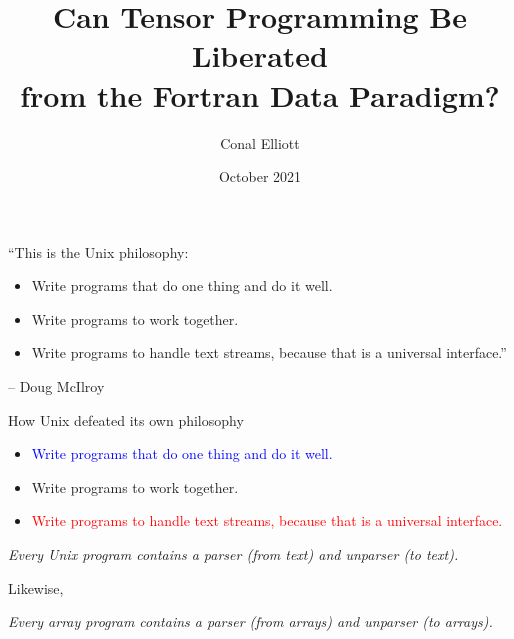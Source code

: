 \documentclass[aspectratio=169]{beamer}
\title[Can Tensor Programming Be Liberated ...?]{Can Tensor Programming Be Liberated\\ from the Fortran Data Paradigm?}
\author{Conal Elliott}
\date{October 2021}
\begin{document}
\maketitle

\begin{frame}{``This is the Unix philosophy:}
\begin{itemize}\itemsep4ex
\item Write programs that do one thing and do it well.
\item Write programs to work together.
\item Write programs to handle text streams, because that is a universal interface.''
\end{itemize}
\vspace{2ex}
\begin{flushright}
-- Doug McIlroy \hspace{0.5in}{\ }
\end{flushright}
\end{frame}

\begin{frame}{How Unix defeated its own philosophy}
\begin{itemize}\itemsep4ex
\item \textcolor{blue}{Write programs that do one thing and do it well.}
\item Write programs to work together.
\item \textcolor{red}{Write programs to handle text streams, because that is a universal interface.}
\end{itemize}

\pause
\vspace{5.5ex}
\emph{Every Unix program contains a parser (from text) and unparser (to text).}
\end{frame}

\begin{frame}{Likewise,}
\begin{center}
\emph{Every array program contains a parser (from arrays) and unparser (to arrays).}
\end{center}
\end{frame}
\end{document}
